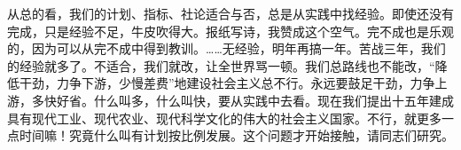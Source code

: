 从总的看，我们的计划、指标、社论适合与否，总是从实践中找经验。即使还没有完成，只是经验不足，牛皮吹得大。报纸写诗，我赞成这个空气。完不成也是乐观的，因为可以从完不成中得到教训。……无经验，明年再搞一年。苦战三年，我们的经验就多了。不适合，我们就改，让全世界骂一顿。我们总路线也不能改，“降低干劲，力争下游，少慢差费”地建设社会主义总不行。永远要鼓足干劲，力争上游，多快好省。什么叫多，什么叫快，要从实践中去看。现在我们提出十五年建成具有现代工业、现代农业、现代科学文化的伟大的社会主义国家。不行，就更多一点时间嘛！究竟什么叫有计划按比例发展。这个问题才开始接触，请同志们研究。


